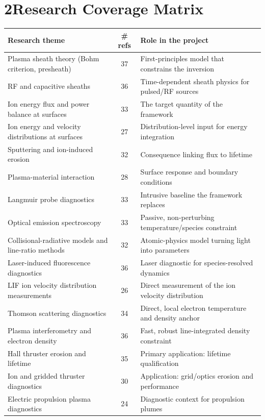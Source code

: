 \documentclass[11pt,a4paper]{article}
\begin{document}
\section*{2\quad Research Coverage Matrix}
\renewcommand{\arraystretch}{1.2}
\begin{longtable}{@{}p{6.6cm}c p{6.0cm}@{}}
\toprule
\textbf{Research theme} & \textbf{\# refs} & \textbf{Role in the project} \\
\midrule\endhead
Plasma sheath theory (Bohm criterion, presheath) & 37 & First-principles model that constrains the inversion \\
RF and capacitive sheaths & 36 & Time-dependent sheath physics for pulsed/RF sources \\
Ion energy flux and power balance at surfaces & 33 & The target quantity of the framework \\
Ion energy and velocity distributions at surfaces & 27 & Distribution-level input for energy integration \\
Sputtering and ion-induced erosion & 32 & Consequence linking flux to lifetime \\
Plasma-material interaction & 28 & Surface response and boundary conditions \\
Langmuir probe diagnostics & 33 & Intrusive baseline the framework replaces \\
Optical emission spectroscopy & 33 & Passive, non-perturbing temperature/species constraint \\
Collisional-radiative models and line-ratio methods & 32 & Atomic-physics model turning light into parameters \\
Laser-induced fluorescence diagnostics & 36 & Laser diagnostic for species-resolved dynamics \\
LIF ion velocity distribution measurements & 26 & Direct measurement of the ion velocity distribution \\
Thomson scattering diagnostics & 34 & Direct, local electron temperature and density anchor \\
Plasma interferometry and electron density & 36 & Fast, robust line-integrated density constraint \\
Hall thruster erosion and lifetime & 35 & Primary application: lifetime qualification \\
Ion and gridded thruster diagnostics & 30 & Application: grid/optics erosion and performance \\
Electric propulsion plasma diagnostics & 24 & Diagnostic context for propulsion plumes \\

\end{longtable}
\end{document}
